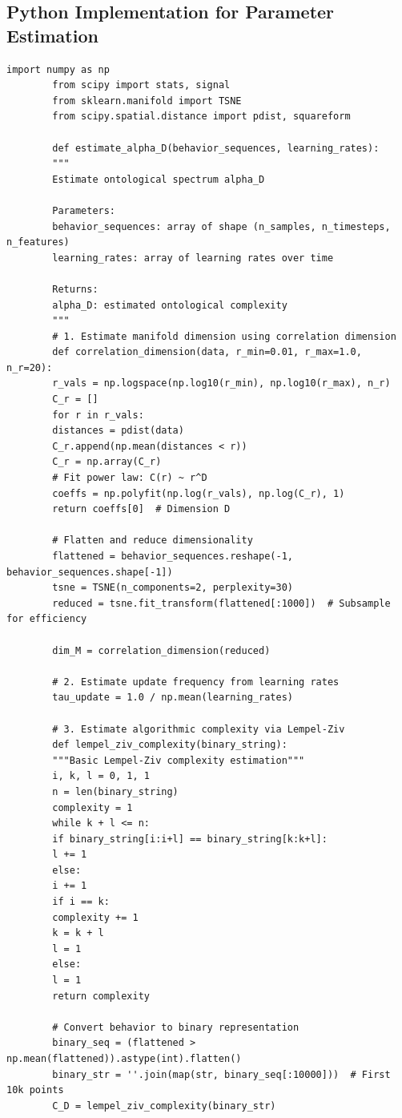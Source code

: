 \documentclass[12pt,a4paper]{article}
\begin{document}
	\subsection{Python Implementation for Parameter Estimation}
	
	\begin{lstlisting}[caption={Python code for estimating UCD parameters from time series data}, label={lst:ucd-python}]
		import numpy as np
		from scipy import stats, signal
		from sklearn.manifold import TSNE
		from scipy.spatial.distance import pdist, squareform
		
		def estimate_alpha_D(behavior_sequences, learning_rates):
		"""
		Estimate ontological spectrum alpha_D
		
		Parameters:
		behavior_sequences: array of shape (n_samples, n_timesteps, n_features)
		learning_rates: array of learning rates over time
		
		Returns:
		alpha_D: estimated ontological complexity
		"""
		# 1. Estimate manifold dimension using correlation dimension
		def correlation_dimension(data, r_min=0.01, r_max=1.0, n_r=20):
		r_vals = np.logspace(np.log10(r_min), np.log10(r_max), n_r)
		C_r = []
		for r in r_vals:
		distances = pdist(data)
		C_r.append(np.mean(distances < r))
		C_r = np.array(C_r)
		# Fit power law: C(r) ~ r^D
		coeffs = np.polyfit(np.log(r_vals), np.log(C_r), 1)
		return coeffs[0]  # Dimension D
		
		# Flatten and reduce dimensionality
		flattened = behavior_sequences.reshape(-1, behavior_sequences.shape[-1])
		tsne = TSNE(n_components=2, perplexity=30)
		reduced = tsne.fit_transform(flattened[:1000])  # Subsample for efficiency
		
		dim_M = correlation_dimension(reduced)
		
		# 2. Estimate update frequency from learning rates
		tau_update = 1.0 / np.mean(learning_rates)
		
		# 3. Estimate algorithmic complexity via Lempel-Ziv
		def lempel_ziv_complexity(binary_string):
		"""Basic Lempel-Ziv complexity estimation"""
		i, k, l = 0, 1, 1
		n = len(binary_string)
		complexity = 1
		while k + l <= n:
		if binary_string[i:i+l] == binary_string[k:k+l]:
		l += 1
		else:
		i += 1
		if i == k:
		complexity += 1
		k = k + l
		l = 1
		else:
		l = 1
		return complexity
		
		# Convert behavior to binary representation
		binary_seq = (flattened > np.mean(flattened)).astype(int).flatten()
		binary_str = ''.join(map(str, binary_seq[:10000]))  # First 10k points
		C_D = lempel_ziv_complexity(binary_str)
		

\end{lstlisting}
\end{document}
